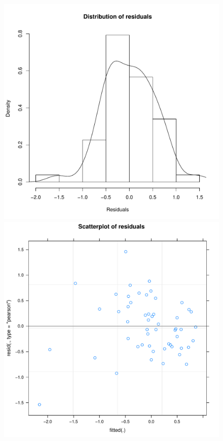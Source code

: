 \begin{CJK}{UTF8}{gbsn}
\begin{figure}[htbp]
    \includegraphics[scale =.4]{images/TEM2Hist.pdf}
    \includegraphics[scale =.4]{images/TEM2Scatter.pdf}

\end{figure}
\end{CJK}
